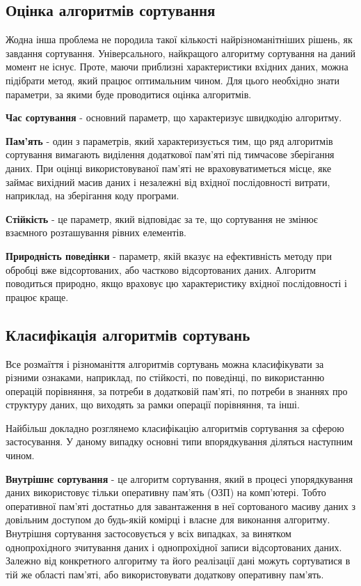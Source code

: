 \subsection{Оцінка алгоритмів сортування}

Жодна інша проблема не породила такої кількості найрізноманітніших рішень, як завдання сортування. Універсального, найкращого алгоритму сортування на даний момент не існує. Проте, маючи приблизні характеристики вхідних даних, можна підібрати метод, який працює оптимальним чином. Для цього необхідно знати параметри, за якими буде проводитися оцінка алгоритмів.

\textbf{Час сортування} - основний параметр, що характеризує швидкодію алгоритму.

\textbf{Пам'ять} - один з параметрів, який характеризується тим, що ряд алгоритмів сортування вимагають виділення додаткової пам'яті під тимчасове зберігання даних. При оцінці використовуваної пам'яті не враховуватиметься місце, яке займає вихідний масив даних і незалежні від вхідної послідовності витрати, наприклад, на зберігання коду програми.

\textbf{Стійкість} - це параметр, який відповідає за те, що сортування не змінює взаємного розташування рівних елементів.

\textbf{Природність поведінки} - параметр, якій вказує на ефективність методу при обробці вже відсортованих, або частково відсортованих даних. Алгоритм поводиться природно, якщо враховує цю характеристику вхідної послідовності і працює краще.

\subsection{Класифікація алгоритмів сортувань}

Все розмаїття і різноманіття алгоритмів сортувань можна класифікувати за різними ознаками, наприклад, по стійкості, по поведінці, по використанню операцій порівняння, за потреби в додатковій пам'яті, по потреби в знаннях про структуру даних, що виходять за рамки операції порівняння, та інші.

Найбільш докладно розглянемо класифікацію алгоритмів сортування за сферою застосування. У даному випадку основні типи впорядкування діляться наступним чином.

\textbf{Внутрішнє сортування} - це алгоритм сортування, який в процесі упорядкування даних використовує тільки оперативну пам'ять (ОЗП) на комп'ютері. Тобто оперативної пам'яті достатньо для завантаження в неї сортованого масиву даних з довільним доступом до будь-якій комірці і власне для виконання алгоритму. Внутрішня сортування застосовується у всіх випадках, за винятком однопрохідного зчитування даних і однопрохідної записи відсортованих даних. Залежно від конкретного алгоритму та його реалізації дані можуть сортуватися в тій же області пам'яті, або використовувати додаткову оперативну пам'ять.

